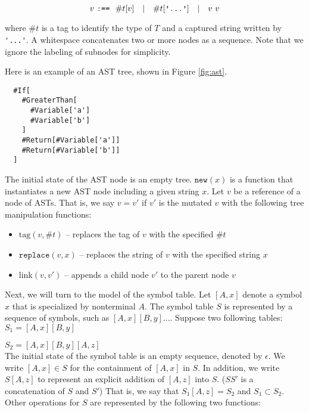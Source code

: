 \documentclass[preprint]{sigplanconf}
\begin{document}
\[
 v ~ \verb|:==| ~~ \#t[v] ~~~ | ~~~ \#t[\verb|'...'|] ~~~ | ~~~v ~ v
\]

\noindent where $\#t$ is a tag to identify the type of $T$ and a captured string written by \verb|'...'|. A whitespace concatenates two or more nodes as a sequence. 
Note that we ignore the labeling of subnodes for simplicity. 



Here is an example of an AST tree, shown in Figure \ref{fig:ast}.

{\small \begin{verbatim}
  #If[
    #GreaterThan[
      #Variable['a'] 
      #Variable['b']
    ]
    #Return[#Variable['a']]
    #Return[#Variable['b']]
  ] 
\end{verbatim}}

The initial state of the AST node is an empty tree. $\texttt{new}(x)$ is a function that instantiates a new AST node including a given string $x$. Let $v$ be a reference of a node of ASTs. That is, we say $v = v'$ if $v'$ is the mutated $v$ with the following tree manipulation functions: 

\begin{itemize}
\item $\text{tag}(v, \#t)$ -- replaces the tag of $v$ with the specified $\#t$
\item $\texttt{replace}(v, x)$ -- replaces the string of $v$ with the specified string $x$
\item $\text{link}(v, v')$ -- appends a child node $v'$ to the parent node $v$
\end{itemize}

Next, we will turn to the model of the symbol table. Let $[A, x]$ denote a symbol $x$ that is specialized by nonterminal $A$. The symbol table $S$ is represented by a sequence of symbols, such as $[A,x][B,y] ... $. Suppose two following tables:\\

$S_1 = [A,x][B,y]$

$S_2 = [A,x][B,y][A,z]$ \\


The initial state of the symbol table is an empty sequence, denoted by $\epsilon$. We write $[A,x] \in S$ for the containment of $[A,x]$ in $S$. In addition, we write $S [A,z]$ to represent an explicit addition of $[A, z]$ into $S$. ($S S'$ is a concatenation of $S$ and $S'$) That is, we say that $S_1 [A,z] = S_2$ and $S_1 \subset S_2$. Other operations for $S$ are represented by the following two functions:
\end{document}
